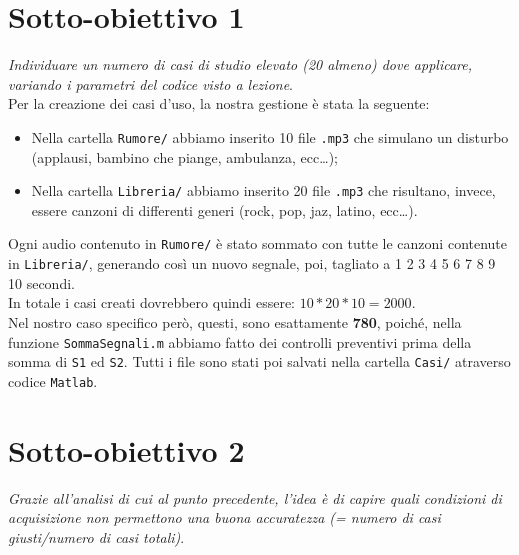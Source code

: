 \documentclass[a4paper, 12pt]{article}
\begin{document}
\section{Sotto-obiettivo 1}
\emph{Individuare un numero di casi di studio elevato (20 almeno) dove applicare, variando i parametri del codice visto a lezione}. \\

Per la creazione dei casi d'uso, la nostra gestione è stata la seguente:
\begin{itemize}
\item Nella cartella \verb|Rumore/| abbiamo inserito 10 file \verb|.mp3| che simulano un disturbo (applausi, bambino che piange, ambulanza, ecc\dots{});
\item Nella cartella \verb|Libreria/| abbiamo inserito 20 file \verb|.mp3| che risultano, invece, essere canzoni di differenti generi (rock, pop, jaz, latino, ecc\dots{}).
\end{itemize}
Ogni audio contenuto in \verb|Rumore/| è stato sommato con tutte le canzoni contenute in \verb|Libreria/|, generando così un nuovo segnale, poi, tagliato a 1 2 3 4 5 6 7 8 9 10 secondi. \\
In totale i casi creati dovrebbero quindi essere: $10*20*10=2000$. \\
Nel nostro caso specifico però, questi, sono esattamente \textbf{780}, poiché, nella funzione \verb|SommaSegnali.m| abbiamo fatto dei controlli preventivi prima della somma di \verb|S1| ed \verb|S2|.
Tutti i file sono stati poi salvati nella cartella \verb|Casi/| atraverso codice \verb|Matlab|.

\section{Sotto-obiettivo 2}
\emph{Grazie all'analisi di cui al punto precedente, l'idea è di capire quali condizioni di acquisizione non permettono una buona accuratezza (= numero di casi giusti/numero di casi totali)}. \\
\end{document}

